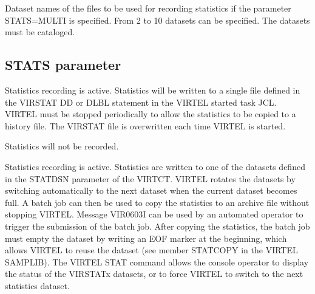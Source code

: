 \documentclass[letterpaper,10pt,english]{sphinxmanual}
\begin{document}
\sphinxAtStartPar
{} \sphinxhyphen{} Dataset names of the files to be used for recording statistics if the parameter STATS=MULTI is specified. From 2 to 10 datasets can be specified. The datasets must be cataloged.

\ignorespaces 

\subsection{STATS parameter}
\label{\detokenize{Installation_Guide:stats-parameter}}\label{\detokenize{Installation_Guide:index-118}}
\begin{sphinxVerbatim}[commandchars=\\\{\}]
     
\end{sphinxVerbatim}

\sphinxAtStartPar
{} \sphinxhyphen{} Statistics recording is active. Statistics will be written to a single file defined in the VIRSTAT DD or DLBL statement in the VIRTEL started task JCL. VIRTEL must be stopped periodically to allow the statistics to be copied to a history file. The VIRSTAT file is overwritten each time VIRTEL is started.

\sphinxAtStartPar
{} \sphinxhyphen{} Statistics will not be recorded.

\sphinxAtStartPar
{} \sphinxhyphen{} Statistics recording is active. Statistics are written to one of the datasets defined in the STATDSN parameter of the VIRTCT. VIRTEL rotates the datasets by switching automatically to the next dataset when the current dataset becomes full. A batch job can then be used to copy the statistics to an archive file without stopping VIRTEL. Message VIR0603I can be used by an automated operator to trigger the submission of the batch job. After copying the statistics, the batch job must empty the dataset by writing an EOF marker at the beginning, which allows VIRTEL to reuse the dataset (see member STATCOPY in the VIRTEL SAMPLIB).
The VIRTEL STAT command allows the console operator to display the status of the VIRSTATx datasets, or to force VIRTEL to switch to the next statistics dataset.
\end{document}
